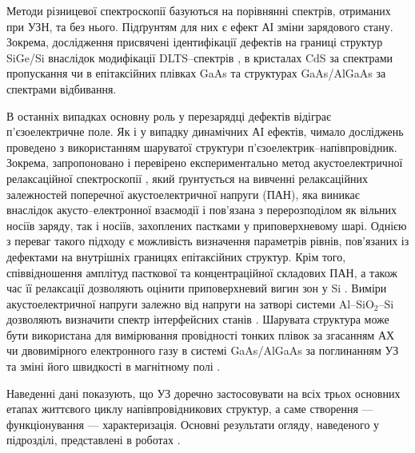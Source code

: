 Методи різницевої спектроскопії базуються на порівнянні спектрів, отриманих при УЗН, та без нього.
Підґрунтям для них є ефект АІ зміни зарядового стану.
Зокрема, дослідження присвячені ідентифікації дефектів на границі структур SiGe/Si внаслідок модифікації DLTS--спектрів \cite{KorotchFTP1996},
в кристалах CdS за спектрами пропускання \cite{KorotFTT93}
чи в епітаксійних плівках GaAs \cite{KorotFTP1994,OSTROVSKII2000,Ostrovskii2001} та
структурах GaAs/AlGaAs \cite{SST:USmethod} за спектрами відбивання.

В останніх випадках основну роль у перезарядці дефектів відіграє п'єзоелектричне поле.
Як і у випадку динамічних АІ ефектів, чимало досліджень проведено з використанням шаруватої структури п'єзоелектрик--напівпровідник.
Зокрема, запропоновано і перевірено експериментально метод акустоелектричної релаксаційної спектроскопії \cite{Saiko1993,OstrovPAN,OlikhSSC}, який ґрунтується на вивченні релаксаційних залежностей
поперечної акустоелектричної напруги (ПАН), яка виникає внаслідок акусто--електронної взаємодії і пов'язана з перерозподілом як вільних носіїв заряду, так і носіїв, захоплених пастками у приповерхневому шарі.
Однією з переваг такого підходу є можливість визначення параметрів рівнів, пов'язаних із дефектами на внутрішніх границях епітаксійних структур.
Крім того,
співвідношення амплітуд пасткової та концентраційної складових ПАН, а також час її релаксації дозволяють оцінити
приповерхневий вигин  зон у Si \cite{PANnew}.
Виміри акустоелектричної напруги залежно від напруги на затворі системи  Al--SiO$_2$--Si дозволяють визначити спектр інтерфейсних станів \cite{USM:Nss}.
Шарувата структура може бути використана для вимірювання провідності тонких плівок за згасанням АХ \cite{USM:provid} чи двовимірного електронного газу в системі  GaAs/AlGaAs за поглинанням УЗ та зміні його швидкості в магнітному полі \cite{PhysRevB83:235318}.












Наведенні дані показують, що УЗ доречно застосовувати на всіх трьох основних етапах життєвого циклу напівпровідникових структур,
а саме створення --- функціонування --- характеризація.
Основні результати огляду, наведеного у підрозділі, представлені в роботах \cite{Olikh:SEMT2004,Olikh:SEMT2011,1UNCPS,2013Buk}.




